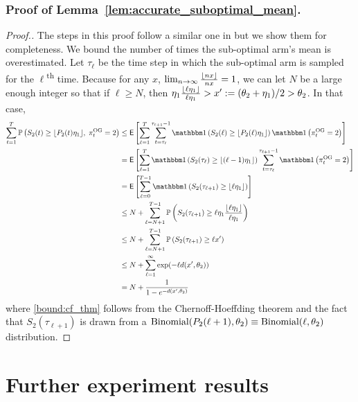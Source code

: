 \subsubsection{Proof of Lemma~\ref{lem:accurate_suboptimal_mean}.} \label{prf:proof_of_acc_sub_means}
\begin{proof}[Proof.]
	The steps in this proof follow a similar one in \cite{agrawal2013further} but we show them for completeness. We bound the number of times the sub-optimal arm's mean is overestimated. Let $\tau_\ell$ be the time step in which the  sub-optimal arm is sampled for the $\ell$\textsuperscript{th} time. Because for any $x$, $\lim_{n\to\infty}\frac{\lfloor nx\rfloor}{nx} = 1$, we can let $N$ be a large enough integer so that if $\ell \ge N$, then $\eta_1 \frac{\lfloor\ell \eta_1\rfloor}{\ell \eta_1} > x' := (\theta_2 + \eta_1)/2 > \theta_2$. In that case,
	\begin{align}
	\sum_{t=1}^T\P{S_2(t) \ge \floor{\Nt{2} \eta_1}, \; \pi^{\rm OG}_t = 2} & \le \Ee{\sum_{\ell=1}^T \sum_{t=\tau_\ell}^{\tau_{\ell+1}-1}\ind{S_2(\ell) \ge \floor{\Ntg{2}{\ell} \eta_1}} \ind{\pi^{\rm OG}_t = 2}} \nonumber \\
	& = \Ee{\sum_{\ell=1}^T \ind{S_2(\tau_{\ell}) \ge \floor{(\ell-1) \eta_1}} \sum_{t=\tau_\ell}^{\tau_{\ell+1}-1} \ind{\pi^{\rm OG}_t = 2}} \nonumber\\
	& = \Ee{\sum_{\ell=0}^{T-1} \ind{S_2(\tau_{\ell+1}) \ge \floor{\ell \eta_1}}} \nonumber\\
	& \le  N + \sum_{\ell=N+1}^{T-1} \P{ S_2(\tau_{\ell+1}) \ge \ell \eta_1 \frac{\floor{\ell \eta_1}}{\ell \eta_1}} \nonumber \\
	& \le N + \sum_{\ell=N+1}^{T-1} \P{ S_2(\tau_{\ell+1}) \ge \ell x'} \nonumber \\
	& \le  N + \sum_{\ell=1}^{\infty} \exp(-\ell d(x', \theta_2)) \label{bound:cf_thm} \\
	& = N + \frac{1}{1 - e^{-d(x',\theta_2)}} \nonumber
	\end{align}
	where \eqref{bound:cf_thm} follows from the Chernoff-Hoeffding theorem and the fact that $S_2(\tau_{\ell+1})$ is drawn from a $\text{Binomial}(P_{2}(\ell+1), \theta_2) \equiv \text{Binomial}(\ell, \theta_2)$ distribution.
\end{proof}

\section{Further experiment results} \label{sec:further_exp}
